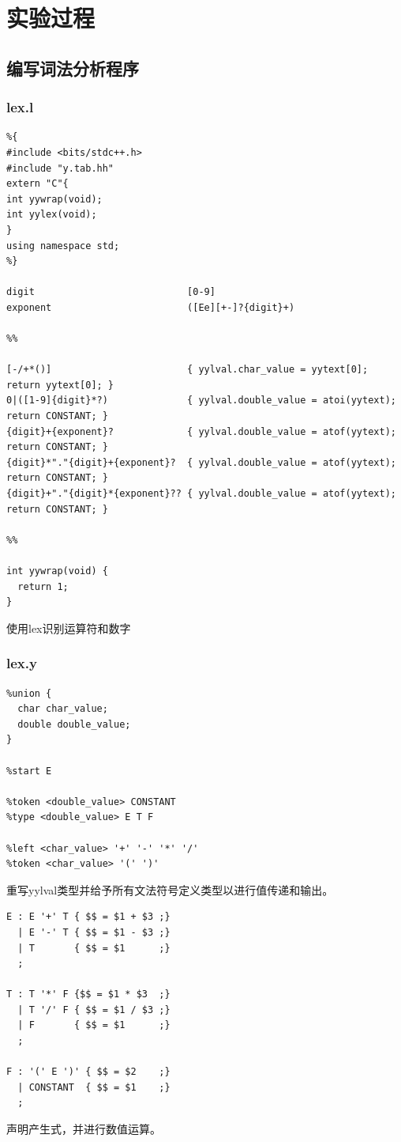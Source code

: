 \section{实验过程}
\subsection{编写词法分析程序}
\subsubsection{lex.l}
\begin{verbatim}
%{
#include <bits/stdc++.h>
#include "y.tab.hh"
extern "C"{
int yywrap(void);
int yylex(void);
}
using namespace std;
%}

digit                           [0-9]
exponent                        ([Ee][+-]?{digit}+)

%%

[-/+*()]                        { yylval.char_value = yytext[0];     return yytext[0]; }
0|([1-9]{digit}*?)              { yylval.double_value = atoi(yytext); return CONSTANT; }
{digit}+{exponent}?             { yylval.double_value = atof(yytext); return CONSTANT; }
{digit}*"."{digit}+{exponent}?  { yylval.double_value = atof(yytext); return CONSTANT; }
{digit}+"."{digit}*{exponent}?? { yylval.double_value = atof(yytext); return CONSTANT; }

%%

int yywrap(void) {
  return 1;
}
\end{verbatim}
使用lex识别运算符和数字

\subsubsection{lex.y}
\begin{verbatim}
%union {
  char char_value;
  double double_value;
}

%start E

%token <double_value> CONSTANT
%type <double_value> E T F

%left <char_value> '+' '-' '*' '/'
%token <char_value> '(' ')'
\end{verbatim}
重写yylval类型并给予所有文法符号定义类型以进行值传递和输出。


\begin{verbatim}
E : E '+' T { $$ = $1 + $3 ;}
  | E '-' T { $$ = $1 - $3 ;}
  | T       { $$ = $1      ;}
  ;

T : T '*' F {$$ = $1 * $3  ;}
  | T '/' F { $$ = $1 / $3 ;}
  | F       { $$ = $1      ;}
  ;

F : '(' E ')' { $$ = $2    ;}
  | CONSTANT  { $$ = $1    ;}
  ;
\end{verbatim}
声明产生式，并进行数值运算。

